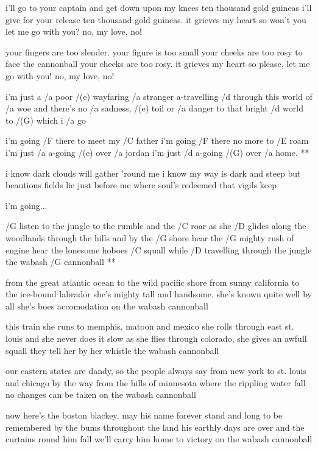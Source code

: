 i'll go to your captain and get down upon my knees
ten thousand gold guineas i'll give for your release
ten thousand gold guineas. it grieves my heart so
won't you let me go with you? no, my love, no! \s

your fingers are too slender. your figure is too small
your cheeks are too rosy to face the cannonball
your cheeks are too rosy. it grieves my heart so
please, let me go with you! no, my love, no!




i'm just a /a poor /(e) wayfaring /a stranger
a-travelling /d through this world of /a woe
and there's no /a sadness, /(e) toil or /a danger
to that bright /d world to /(G) which i /a go

\R  i'm going /F there to meet my /C father
    i'm going /F there no more to /E roam
    i'm just /a a-going /(e) over /a jordan
    i'm just /d a-going /(G) over /a home. **

i know dark clouds will gather 'round me
i know my way is dark and steep
but beautious fields lie just before me
where soul's redeemed that vigils keep

\r  i'm going...




\R  /G listen to the jungle
    to the rumble and the /C roar
    as she /D glides along the woodlands
    through the hills and by the /G shore
    hear the /G mighty rush of engine
    hear the lonesome hoboes /C squall
    while /D travelling through the jungle
    the wabash /G cannonball **

from the great atlantic ocean to the wild pacific shore
from sunny california to the ice-bound labrador
she's mighty tall and handsome, she's known quite well by all
she's boes accomodation on the wabash cannonball \s

this train she runs to memphis, matoon and mexico
she rolls through east st. louis and she never does it slow
as she flies through colorado, she gives an awfull squall
they tell her by her whistle the wabash cannonball \s

our eastern states are dandy, so the people always say
from new york to st. louis and chicago by the way
from the hills of minnesota where the rippling water fall
no changes can be taken on the wabash cannonball \s

now here's the boston blackey, may his name forever stand
and long to be remembered by the bums throughout the land
his earthly days are over and the curtains round him fall
we'll carry him home to victory on the wabash cannonball



